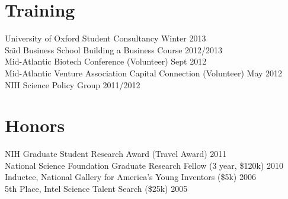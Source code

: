 \documentclass[margin]{res}
\newcommand{\nblocdatesubsection}[3]{#1 (#2) \hfill #3 }
\newcommand{\nbdatesubsection}[2]{#1 \hfill #2 }
\begin{document}
\begin{sloppypar}
\begin{resume}
\section{Training}
\nbdatesubsection{University of Oxford Student Consultancy}{Winter 2013} \\
\nbdatesubsection{Sa\"\i d Business School Building a Business Course}{2012/2013} \\
\nbdatesubsection{Mid-Atlantic Biotech Conference (Volunteer)}{Sept 2012} \\
\nbdatesubsection{Mid-Atlantic Venture Association Capital Connection (Volunteer)}{May 2012} \\
\nbdatesubsection{NIH Science Policy Group}{2011/2012} 



\section{Honors}
\nblocdatesubsection{NIH Graduate Student Research Award}{Travel Award}{2011} \\
\nblocdatesubsection{National Science Foundation Graduate Research Fellow}{3 year, \$120k}{2010} \\
\nblocdatesubsection{Inductee, National Gallery for America's Young Inventors}{\$5k}{2006} \\
\nblocdatesubsection{5th Place, Intel Science Talent Search}{\$25k}{2005}


\end{resume}
\end{sloppypar}
\end{document}
